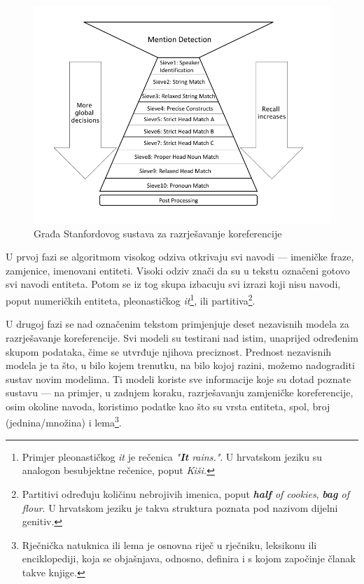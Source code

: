 \documentclass[a4paper,twoside,12pt]{memoir} %
\newcommand{\ti}[1]{\textit{#1\/}}
\newcommand{\tb}{\textbf}
\begin{document}
	\begin{figure}[H]
		\centering
		\includegraphics[scale = 0.71]{sieve.png}
		\caption{Građa Stanfordovog sustava za razrješavanje koreferencije}
		\label{sieve}
	\end{figure}

	U prvoj fazi se algoritmom visokog odziva otkrivaju svi navodi --- imeničke fraze, zamjenice, imenovani entiteti. Visoki odziv znači da su u tekstu označeni gotovo svi navodi entiteta. Potom se iz tog skupa izbacuju svi izrazi koji nisu navodi, poput numeričkih entiteta, pleonastičkog \ti{it}\footnote{Primjer pleonastičkog \ti{it} je rečenica \ti{"\tb{It} rains."}. U hrvatskom jeziku su analogon besubjektne rečenice, poput \ti{Kiši.}}, ili partitiva\footnote{Partitivi određuju količinu nebrojivih imenica, poput \ti{\tb{half} of cookies}, \ti{\tb{bag} of flour}. U hrvatskom jeziku je takva struktura poznata pod nazivom dijelni genitiv.}.

	U drugoj fazi se nad označenim tekstom primjenjuje deset nezavisnih modela za razrješavanje koreferencije. Svi modeli su testirani nad istim, unaprijed određenim skupom podataka, čime se utvrđuje njihova preciznost. Prednost nezavisnih modela je ta što, u bilo kojem trenutku, na bilo kojoj razini, možemo nadograditi sustav novim modelima. Ti modeli koriste sve informacije koje su dotad poznate sustavu --- na primjer, u zadnjem koraku, razrješavanju zamjeničke koreferencije, osim okoline navoda, koristimo podatke kao što su vrsta entiteta, spol, broj (jednina/množina) i lema\footnote{Rječnička natuknica ili lema je osnovna riječ u rječniku, leksikonu ili enciklopediji, koja se objašnjava, odnosno, definira i s kojom započinje članak takve knjige.}.
\end{document}
